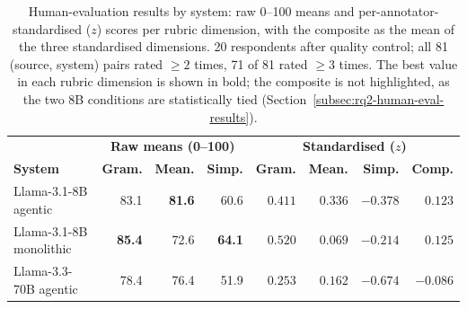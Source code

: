 
\begin{table}[h!]
\centering
\begin{tabular}{lrrr|rrrr}
\hline
& \multicolumn{3}{c|}{\textbf{Raw means (0--100)}} & \multicolumn{4}{c}{\textbf{Standardised ($z$)}} \\
\textbf{System} & \textbf{Gram.} & \textbf{Mean.} & \textbf{Simp.} & \textbf{Gram.} & \textbf{Mean.} & \textbf{Simp.} & \textbf{Comp.} \\
\hline
Llama-3.1-8B agentic     & 83.1 & \textbf{81.6} & 60.6 & $0.411$ & $\mathbf{0.336}$ & $-0.378$ & $0.123$ \\
Llama-3.1-8B monolithic  & \textbf{85.4} & 72.6 & \textbf{64.1} & $\mathbf{0.520}$ & $0.069$ & $\mathbf{-0.214}$ & $0.125$ \\
Llama-3.3-70B agentic    & 78.4 & 76.4 & 51.9 & $0.253$ & $0.162$ & $-0.674$ & $-0.086$ \\
\hline
\end{tabular}
\caption{Human-evaluation results by system: raw 0--100 means and per-annotator-standardised ($z$) scores per rubric dimension, with the composite as the mean of the three standardised dimensions. 20 respondents after quality control; all 81 (source, system) pairs rated $\geq 2$ times, 71 of 81 rated $\geq 3$ times. The best value in each rubric dimension is shown in bold; the composite is not highlighted, as the two 8B conditions are statistically tied (Section~\ref{subsec:rq2-human-eval-results}).}
\label{tab:rq3-survey-results}
\end{table}

